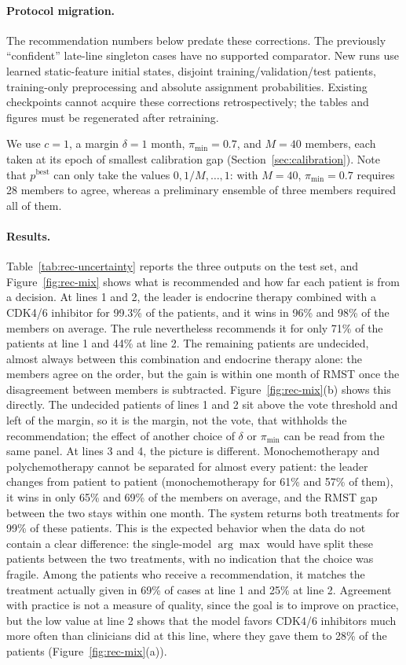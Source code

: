 \documentclass[a4paper,10pt]{article}
\begin{document}
\paragraph{Protocol migration.} The recommendation numbers below predate these corrections. The previously ``confident'' late-line singleton cases have no supported comparator. New runs use learned static-feature initial states, disjoint training/validation/test patients, training-only preprocessing and absolute assignment probabilities. Existing checkpoints cannot acquire these corrections retrospectively; the tables and figures must be regenerated after retraining.

We use $c = 1$, a margin $\delta = 1$ month, $\pi_{\min} = 0.7$, and $M = 40$ members, each taken at its epoch of smallest calibration gap (Section~\ref{sec:calibration}). Note that $p^{\text{best}}$ can only take the values $0, 1/M, \ldots, 1$: with $M = 40$, $\pi_{\min} = 0.7$ requires 28 members to agree, whereas a preliminary ensemble of three members required all of them.

\paragraph{Results.} Table~\ref{tab:rec-uncertainty} reports the three outputs on the test set, and Figure~\ref{fig:rec-mix} shows what is recommended and how far each patient is from a decision. At lines 1 and 2, the leader is endocrine therapy combined with a CDK4/6 inhibitor for 99.3\% of the patients, and it wins in 96\% and 98\% of the members on average. The rule nevertheless recommends it for only 71\% of the patients at line 1 and 44\% at line 2. The remaining patients are undecided, almost always between this combination and endocrine therapy alone: the members agree on the order, but the gain is within one month of RMST once the disagreement between members is subtracted. Figure~\ref{fig:rec-mix}(b) shows this directly. The undecided patients of lines 1 and 2 sit above the vote threshold and left of the margin, so it is the margin, not the vote, that withholds the recommendation; the effect of another choice of $\delta$ or $\pi_{\min}$ can be read from the same panel. At lines 3 and 4, the picture is different. Monochemotherapy and polychemotherapy cannot be separated for almost every patient: the leader changes from patient to patient (monochemotherapy for 61\% and 57\% of them), it wins in only 65\% and 69\% of the members on average, and the RMST gap between the two stays within one month. The system returns both treatments for 99\% of these patients. This is the expected behavior when the data do not contain a clear difference: the single-model $\arg\max$ would have split these patients between the two treatments, with no indication that the choice was fragile. Among the patients who receive a recommendation, it matches the treatment actually given in 69\% of cases at line 1 and 25\% at line 2. Agreement with practice is not a measure of quality, since the goal is to improve on practice, but the low value at line 2 shows that the model favors CDK4/6 inhibitors much more often than clinicians did at this line, where they gave them to 28\% of the patients (Figure~\ref{fig:rec-mix}(a)).
\end{document}
